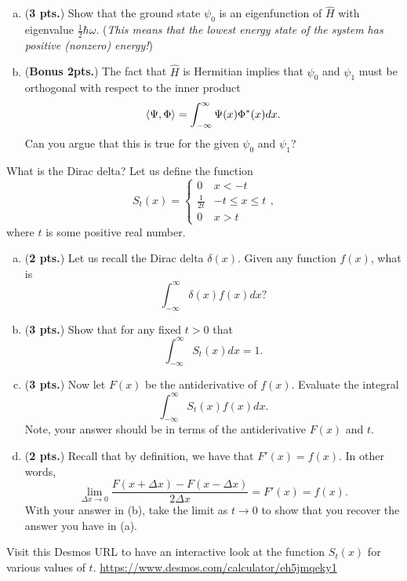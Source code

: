 \documentclass[12pt]{amsbook}
\begin{document}
\begin{problem}
\begin{enumerate}[(a)]
	\item (\textbf{3 pts.}) Show that the ground state $\psi_0$ is an eigenfunction of $\hat{H}$ with eigenvalue $\frac{1}{2} \hbar \omega$. (\textit{This means that the lowest energy state of the system has positive (nonzero) energy!})
	
	\item (\textbf{Bonus 2pts.}) The fact that $\hat{H}$ is Hermitian implies that $\psi_0$ and $\psi_1$ must be orthogonal with respect to the inner product
	\[
	\left\langle \Psi, \Phi\right\rangle = \int_{-\infty}^\infty \Psi(x)\Phi^*(x)dx.
	\]
	Can you argue that this is true for the given $\psi_0$ and $\psi_1$?
	\end{enumerate}
\end{problem}

\newpage
\begin{problem}
What is the Dirac delta? Let us define the function 
\[
S_t(x) = \begin{cases} 0 & x< -t \\ \frac{1}{2t} & -t\leq x \leq t \\ 0 & x>t \end{cases},
\]
where $t$ is some positive real number.
\begin{enumerate}[(a)]
	\item (\textbf{2 pts.}) Let us recall the Dirac delta $\delta(x)$. Given any function $f(x)$, what is
	\[
	\int_{-\infty}^\infty \delta(x) f(x)dx?
	\]
	\item (\textbf{3 pts.}) Show that for any fixed $t>0$ that 
	\[
	\int_{-\infty}^{\infty} S_t(x)dx = 1.
	\]
	\item (\textbf{3 pts.}) Now let $F(x)$ be the antiderivative of $f(x)$.  Evaluate the integral
	\[
	\int_{-\infty}^\infty S_t(x)f(x)dx.
	\]
	Note, your answer should be in terms of the antiderivative $F(x)$ and $t$.
	\item (\textbf{2 pts.}) Recall that by definition, we have that $F'(x)=f(x)$.  In other words,
	\[
	\lim_{\Delta x \to 0} \frac{F(x+\Delta x)-F(x-\Delta x)}{2\Delta x} = F'(x) = f(x).
	\]
	With your answer in (b), take the limit as $t\to 0$ to show that you recover the answer you have in (a).
\end{enumerate}
Visit this Desmos URL to have an interactive look at the function $S_t(x)$ for various values of $t$.  \url{https://www.desmos.com/calculator/eh5jmqeky1}
\end{problem}
\end{document}
